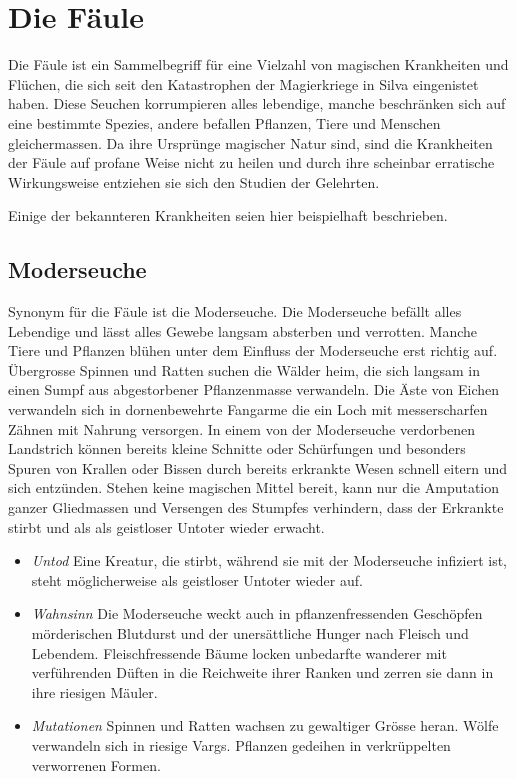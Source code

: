\documentclass[12pt,twoside,twocolumn,openany]{book}
\begin{document}
\section{Die Fäule}
Die Fäule ist ein Sammelbegriff für eine Vielzahl von magischen Krankheiten und Flüchen, die sich seit den Katastrophen der Magierkriege in Silva eingenistet haben. Diese Seuchen korrumpieren alles lebendige, manche beschränken sich auf eine bestimmte Spezies, andere befallen Pflanzen, Tiere und Menschen gleichermassen. Da ihre Ursprünge magischer Natur sind, sind die Krankheiten der Fäule auf profane Weise nicht zu heilen und durch ihre scheinbar erratische Wirkungsweise entziehen sie sich den Studien der Gelehrten.

Einige der bekannteren Krankheiten seien hier beispielhaft beschrieben.

\subsection{Moderseuche}
Synonym für die Fäule ist die Moderseuche. Die Moderseuche befällt alles Lebendige und lässt alles Gewebe langsam absterben und verrotten. Manche Tiere und Pflanzen blühen unter dem Einfluss der Moderseuche erst richtig auf. Übergrosse Spinnen und Ratten suchen die Wälder heim, die sich langsam in einen Sumpf aus abgestorbener Pflanzenmasse verwandeln. Die Äste von Eichen verwandeln sich in dornenbewehrte Fangarme die ein Loch mit messerscharfen Zähnen mit Nahrung versorgen. In einem von der Moderseuche verdorbenen Landstrich können bereits kleine Schnitte oder Schürfungen und besonders Spuren von Krallen oder Bissen durch bereits erkrankte Wesen schnell eitern und sich entzünden. Stehen keine magischen Mittel bereit, kann nur die Amputation ganzer Gliedmassen und Versengen des Stumpfes verhindern, dass der Erkrankte stirbt und als als geistloser Untoter wieder erwacht.


\begin{itemize}
	\item \textit{Untod} Eine Kreatur, die stirbt, während sie mit der Moderseuche infiziert ist, steht möglicherweise als geistloser Untoter wieder auf.
	
	\item \emph{Wahnsinn} Die Moderseuche weckt auch in pflanzenfressenden Geschöpfen mörderischen Blutdurst und der unersättliche Hunger nach Fleisch und Lebendem. Fleischfressende Bäume locken unbedarfte wanderer mit verführenden Düften in die Reichweite ihrer Ranken und zerren sie dann in ihre riesigen Mäuler.
	
	\item \emph{Mutationen} Spinnen und Ratten wachsen zu gewaltiger Grösse heran. Wölfe verwandeln sich in riesige Vargs. Pflanzen gedeihen in verkrüppelten verworrenen Formen.
\end{itemize}
\end{document}
